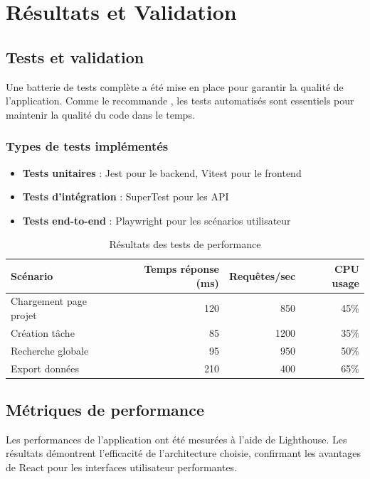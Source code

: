 \chapter{Résultats et Validation}

\section{Tests et validation}
Une batterie de tests complète a été mise en place pour garantir la qualité de l'application. Comme le recommande \cite{martin2017clean}, les tests automatisés sont essentiels pour maintenir la qualité du code dans le temps.

\subsection{Types de tests implémentés}
\begin{itemize}
	\item \textbf{Tests unitaires} : Jest pour le backend, Vitest pour le frontend
	\item \textbf{Tests d'intégration} : SuperTest pour les API
	\item \textbf{Tests end-to-end} : Playwright pour les scénarios utilisateur
\end{itemize}

\begin{table}[H]
	\centering
	\caption{Résultats des tests de performance}
	\begin{tabular}{lrrr}
		\toprule
		\textbf{Scénario} & \textbf{Temps réponse (ms)} & \textbf{Requêtes/sec} & \textbf{CPU usage} \\
		\midrule
		Chargement page projet & 120 & 850 & 45\% \\
		Création tâche & 85 & 1200 & 35\% \\
		Recherche globale & 95 & 950 & 50\% \\
		Export données & 210 & 400 & 65\% \\
		\bottomrule
	\end{tabular}
\end{table}

\section{Métriques de performance}
Les performances de l'application ont été mesurées à l'aide de Lighthouse. Les résultats démontrent l'efficacité de l'architecture choisie, confirmant les avantages de React \cite{react2024} pour les interfaces utilisateur performantes.

